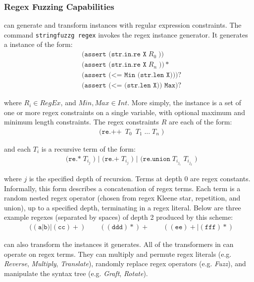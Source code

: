 \subsubsection{Regex Fuzzing Capabilities}

\fuzzer{} can generate
and transform instances with regular expression constraints. The
command \texttt{stringfuzzg regex} invokes the regex instance
generator. It generates a instance of the form:
\begin{align*}
    & \texttt{(assert (str.in.re X}\; R_0\; \texttt{))} \\
    & \texttt{(assert (str.in.re X}\; R_n\; \texttt{))}* \\
    & \texttt{(assert (<= Min (str.len X)))}? \\
    & \texttt{(assert (<= (str.len X)) Max)}?
\end{align*}

where $R_i \in RegEx$, and $Min, Max \in Int$. More simply, the
instance is a set of one or more regex constraints on a single
variable, with optional maximum and minimum length constraints. The
regex constraints $R$ are each of the form:
\begin{align*}
  & \texttt{(re.++}\; \ T_0\; \ T_1\; \texttt{...}\; T_n\; \texttt{)}
\end{align*}

and each $T_i$ is a recursive term of the form:
\begin{align*}
  & \texttt{(re.*}\; T_{i_j}\; \texttt{) | (re.+}\; T_{i_j}\;
  \texttt{) | (re.union}\; T_{i_{j_1}}\; T_{i_{j_2}}\; \texttt{)}
\end{align*}

where $j$ is the specified depth of recursion. Terms at depth 0 are
regex constants. Informally, this form describes a concatenation of
regex terms. Each term is a random nested regex operator (chosen from
regex Kleene star, repetition, and union), up to a specified depth,
terminating in a regex literal. Below are three example regexes
(separated by spaces) of depth 2 produced by this scheme:
\begin{align*}
  & ((\texttt{a}|\texttt{b})|(\texttt{cc})+)\quad\quad
  ((\texttt{ddd})*)+\quad\quad ((\texttt{ee})+|(\texttt{fff})*)
\end{align*}

\fuzzer{} can also transform the instances it generates. All of the
transformers in \transformer{} can operate on regex terms. They can
multiply and permute regex literals (e.g. \textit{Reverse},
\textit{Multiply}, \textit{Translate}), randomly replace regex
operators (e.g. \textit{Fuzz}), and manipulate the syntax tree
(e.g. \textit{Graft}, \textit{Rotate}).

